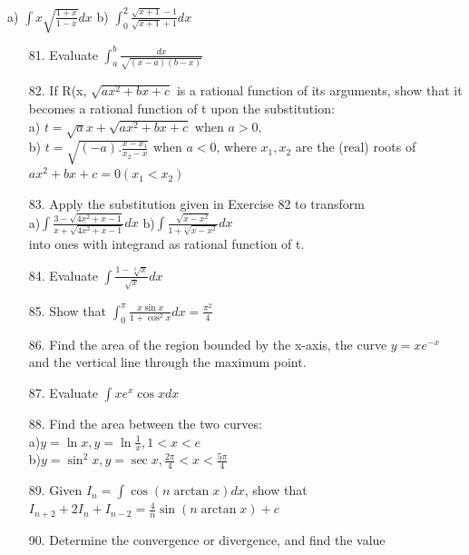 \documentclass[11pt]{amsbook}
\begin{document}
	a) $\int x \sqrt{\frac{1+x}{1-x}}dx$ \quad
    	b) $\int^2_0 {\frac{\sqrt{x+1}-1}{\sqrt{x+1}+1}}dx$	
	
	\begin{enumerate}
		

    	\item[81.]
    	Evaluate $\int^b_a \frac{dx} {\sqrt{(x-a)(b-x)}}$

    	\item[82.]
    	If R(x, $\sqrt{ax^2 + bx + c}$ is a rational function of its arguments, show that it becomes a rational function of t upon the substitution: \\
    	a) $ t = \sqrt{a}x+\sqrt{ax^2 + bx + c}$ when $a > 0,$\\
    	b) $ t = \sqrt{(-a).\frac{x - x_1}{x_2 - x}}$ when $a < 0$, where $x_1, x_2$ are the (real) roots of $ax^2+bx+c=0 (x_1 < x_2)$

    	\item[83.]
    	Apply the substitution given in Exercise 82 to transform\\
   	a)$\int\frac{3-\sqrt{4x^2+x-1}}{x+\sqrt{4x^2+x-1}}dx$
    	b)$\int\frac{\sqrt{x - x^2}}{1 + \sqrt{x - x^2}}dx$ \\
    	into ones with integrand as rational function of t.

    	\item[84.]
    	Evaluate $\int \frac{1-\sqrt[3]{x}}{\sqrt{x}}dx$

    	\item[85.]
    	Show that $\int^\pi_0 \frac{x \sin x}{1+\cos ^2x}dx = \frac{\pi^2}{4}$

    	\item[86.]
    	Find the area of the region bounded by the x-axis, the curve $y=xe^{-x}$ and the vertical line through the maximum point.

    	\item[87.]
    	Evaluate $\int x e^x \cos x dx$

    	\item[88.]
    	Find the area between the two curves:\\
    	a)$y=\ln x, y = \ln \frac{1}{x}, 1 < x < e $ \\
    	b)$y=\sin ^2x,y = \sec x, \frac{2\pi}{4} < x < \frac{5\pi}{4}$

    	\item[89.]
    	Given $I_n = \int \cos (n \arctan x)dx$, show that $I_{n+2} + 2I_n + I_{n-2} = \frac{4}{n} \sin (n \arctan x)+c$ 

    	\item[90.]
    	Determine the convergence or divergence, and find the value

	\end{enumerate}
\end{document}
